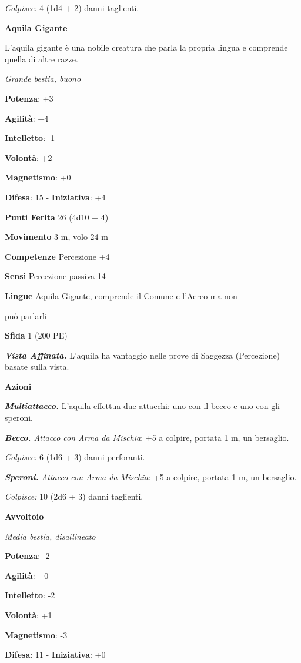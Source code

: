 \begin{multicols}{2}
\emph{Colpisce:} 4 (1d4 + 2) danni taglienti.

\textbf{Aquila Gigante}

L'aquila gigante è una nobile creatura che parla la propria lingua e
comprende quella di altre razze.

\emph{Grande bestia, buono}

\textbf{Potenza}: +3

\textbf{Agilità}: +4

\textbf{Intelletto}: -1

\textbf{Volontà}: +2

\textbf{Magnetismo}: +0

\textbf{Difesa}: 15 - \textbf{Iniziativa}: +4

\textbf{Punti Ferita} 26 (4d10 + 4)

\textbf{Movimento} 3 m, volo 24 m

\textbf{Competenze} Percezione +4

\textbf{Sensi} Percezione passiva 14

\textbf{Lingue} Aquila Gigante, comprende il Comune e l'Aereo ma non

può parlarli

\textbf{Sfida} 1 (200 PE)\smallskip

\emph{\textbf{Vista Affinata.}} L'aquila ha vantaggio nelle prove di
Saggezza (Percezione) basate sulla vista.

\smallskip\textbf{Azioni}

\emph{\textbf{Multiattacco.}} L'aquila effettua due attacchi: uno con il
becco e uno con gli speroni.

\emph{\textbf{Becco.} Attacco con Arma da Mischia}: +5 a colpire,
portata 1 m, un bersaglio.

\emph{Colpisce:} 6 (1d6 + 3) danni perforanti.

\emph{\textbf{Speroni.} Attacco con Arma da Mischia}: +5 a colpire,
portata 1 m, un bersaglio.

\emph{Colpisce:} 10 (2d6 + 3) danni taglienti.

\textbf{Avvoltoio}

\emph{Media bestia, disallineato}

\textbf{Potenza}: -2

\textbf{Agilità}: +0

\textbf{Intelletto}: -2

\textbf{Volontà}: +1

\textbf{Magnetismo}: -3

\textbf{Difesa}: 11 - \textbf{Iniziativa}: +0


\end{multicols}

